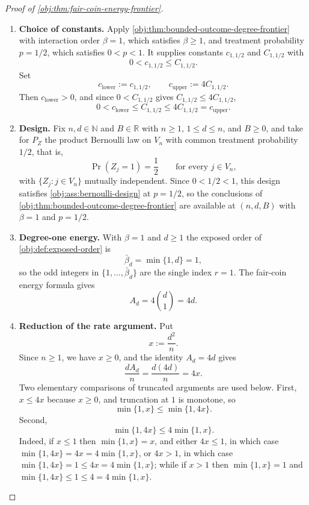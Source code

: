 \begin{proof}[Proof of \cref{obj:thm:fair-coin-energy-frontier}]
\begin{enumerate}
\item \textbf{Choice of constants.}
Apply \cref{obj:thm:bounded-outcome-degree-frontier} with interaction order \(\beta=1\), which satisfies \(\beta\ge1\), and treatment probability \(p=1/2\), which satisfies \(0<p<1\).  It supplies constants \(c_{1,1/2}\) and \(C_{1,1/2}\) with
\[
0<c_{1,1/2}\le C_{1,1/2}.
\]
Set
\[
c_{\mathrm{lower}}:=c_{1,1/2},
\qquad
c_{\mathrm{upper}}:=4C_{1,1/2}.
\]
Then \(c_{\mathrm{lower}}>0\), and since \(0<C_{1,1/2}\) gives \(C_{1,1/2}\le4C_{1,1/2}\),
\[
0<c_{\mathrm{lower}}\le C_{1,1/2}\le 4C_{1,1/2}=c_{\mathrm{upper}}.
\] %

\item \textbf{Design.}
Fix \(n,d\in\mathbb N\) and \(B\in\mathbb R\) with \(n\ge1\), \(1\le d\le n\), and \(B\ge0\), and take for \(P_Z\) the product Bernoulli law on \(V_n\) with common treatment probability \(1/2\), that is,
\[
\Pr(Z_j=1)=\frac12
\qquad\text{for every }j\in V_n,
\]
with \(\{Z_j:j\in V_n\}\) mutually independent.  Since \(0<1/2<1\), this design satisfies \cref{obj:ass:bernoulli-design} at \(p=1/2\), so the conclusions of \cref{obj:thm:bounded-outcome-degree-frontier} are available at \((n,d,B)\) with \(\beta=1\) and \(p=1/2\). %

\item \textbf{Degree-one energy.}
With \(\beta=1\) and \(d\ge1\) the exposed order of \cref{obj:def:exposed-order} is
\[
\bar\beta_d=\min\{1,d\}=1,
\]
so the odd integers in \(\{1,\ldots,\bar\beta_d\}\) are the single index \(r=1\).  The fair-coin energy formula gives
\[
A_d
=
4\binom d1
=
4d.
\] %

\item \textbf{Reduction of the rate argument.}
Put
\[
x:=\frac{d^2}{n}.
\]
Since \(n\ge1\), we have \(x\ge0\), and the identity \(A_d=4d\) gives
\[
\frac{dA_d}{n}
=
\frac{d(4d)}{n}
=
4x.
\]
Two elementary comparisons of truncated arguments are used below.  First, \(x\le4x\) because \(x\ge0\), and truncation at \(1\) is monotone, so
\[
\min\{1,x\}\le\min\{1,4x\}.
\]
Second,
\[
\min\{1,4x\}\le4\min\{1,x\}.
\]
Indeed, if \(x\le1\) then \(\min\{1,x\}=x\), and either \(4x\le1\), in which case \(\min\{1,4x\}=4x=4\min\{1,x\}\), or \(4x>1\), in which case \(\min\{1,4x\}=1\le4x=4\min\{1,x\}\); while if \(x>1\) then \(\min\{1,x\}=1\) and \(\min\{1,4x\}\le1\le4=4\min\{1,x\}\). %


\end{enumerate}
\end{proof}
